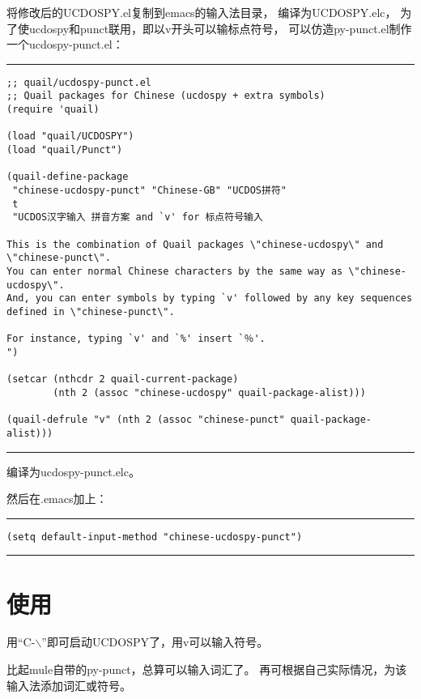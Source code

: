 \documentclass[letterpaper]{article}
\begin{document}
\begin{CJK*}{GB}{song}
将修改后的UCDOSPY.el复制到emacs的输入法目录，
编译为UCDOSPY.elc，
为了使ucdospy和punct联用，即以v开头可以输标点符号，
可以仿造py-punct.el制作一个ucdospy-punct.el：
\begin{tscreen}
\par
\addvspace{\medskipamount}
\nopagebreak\hrule
\begin{verbatim}
;; quail/ucdospy-punct.el 
;; Quail packages for Chinese (ucdospy + extra symbols)
(require 'quail)

(load "quail/UCDOSPY")
(load "quail/Punct")

(quail-define-package
 "chinese-ucdospy-punct" "Chinese-GB" "UCDOS拼符"
 t
 "UCDOS汉字输入 拼音方案 and `v' for 标点符号输入

This is the combination of Quail packages \"chinese-ucdospy\" and \"chinese-punct\".
You can enter normal Chinese characters by the same way as \"chinese-ucdospy\".
And, you can enter symbols by typing `v' followed by any key sequences
defined in \"chinese-punct\".

For instance, typing `v' and `%' insert `％'.
")

(setcar (nthcdr 2 quail-current-package)
        (nth 2 (assoc "chinese-ucdospy" quail-package-alist)))

(quail-defrule "v" (nth 2 (assoc "chinese-punct" quail-package-alist)))
\end{verbatim} 
\nopagebreak\hrule 
\addvspace{\medskipamount}
\end{tscreen}

编译为ucdospy-punct.elc。

然后在.emacs加上：
\begin{tscreen}
\par
\addvspace{\medskipamount}
\nopagebreak\hrule
\begin{verbatim}
(setq default-input-method "chinese-ucdospy-punct")
\end{verbatim} 
\nopagebreak\hrule 
\addvspace{\medskipamount}
\end{tscreen}





\section{使用}

用``C-$\backslash$''即可启动UCDOSPY了，用v可以输入符号。

比起mule自带的py-punct，总算可以输入词汇了。
再可根据自己实际情况，为该输入法添加词汇或符号。



\newpage
\end{CJK*}
\end{document}

